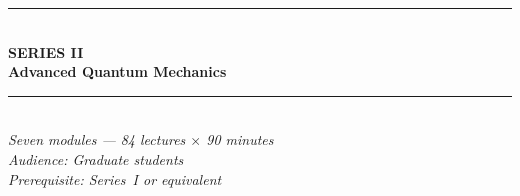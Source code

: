 \documentclass[11pt,a4paper]{article}
\begin{document}
\newpage
\thispagestyle{empty}
\pagecolor{darkblue}
\color{white}
\vspace*{2.2cm}
\begin{center}
  {\color{accentgold}\rule{11cm}{1.5pt}}\\[0.5cm]
  {\fontsize{11}{14}\selectfont\bfseries\color{accentgold}\MakeUppercase{Series II}}\\[0.3cm]
  {\fontsize{26}{32}\selectfont\bfseries Advanced Quantum Mechanics}\\[0.4cm]
  {\color{accentgold}\rule{11cm}{1.5pt}}\\[1.0cm]
  {\large\itshape Seven modules --- 84 lectures $\times$ 90 minutes}\\[0.5cm]
  {\normalsize\itshape Audience: Graduate students}\\[0.3cm]
  {\normalsize\itshape Prerequisite: Series~I or equivalent}\\[1.4cm]


\end{center}
\end{document}
